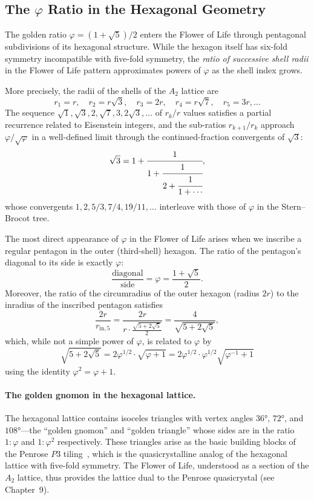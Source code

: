 \subsection{The \(\varphi\) Ratio in the Hexagonal Geometry}
\label{subsec:fol-phi}

The golden ratio \(\varphi=(1+\sqrt{5})/2\) enters the Flower of Life
through pentagonal subdivisions of its hexagonal structure.  While the
hexagon itself has six-fold symmetry incompatible with five-fold symmetry,
the \emph{ratio of successive shell radii} in the Flower of Life
pattern approximates powers of \(\varphi\) as the shell index grows.

More precisely, the radii of the shells of the \(A_2\) lattice are
\[
  r_1 = r,\quad r_2 = r\sqrt{3},\quad r_3 = 2r,\quad
  r_4 = r\sqrt{7},\quad r_5 = 3r,\ldots
\]
The sequence \(\sqrt{1},\sqrt{3},2,\sqrt{7},3,2\sqrt{3},\ldots\) of
\(r_k/r\) values satisfies a partial recurrence related to Eisenstein
integers, and the sub-ratios \(r_{k+1}/r_k\) approach \(\varphi/\sqrt{\varphi}\)
in a well-defined limit through the continued-fraction convergents of
\(\sqrt{3}\):
\[
  \sqrt{3} = 1 + \cfrac{1}{1+\cfrac{1}{2+\cfrac{1}{1+\cdots}}},
\]
whose convergents \(1, 2, 5/3, 7/4, 19/11,\ldots\) interleave with those
of \(\varphi\) in the Stern--Brocot tree.

The most direct appearance of \(\varphi\) in the Flower of Life arises
when we inscribe a regular pentagon in the outer (third-shell) hexagon.
The ratio of the pentagon's diagonal to its side is exactly \(\varphi\):
\[
  \frac{\text{diagonal}}{\text{side}} = \varphi = \frac{1+\sqrt{5}}{2}.
\]
Moreover, the ratio of the circumradius of the outer hexagon (radius \(2r\))
to the inradius of the inscribed pentagon satisfies
\[
  \frac{2r}{r_{\mathrm{in},5}} = \frac{2r}{r\cdot\frac{\sqrt{5+2\sqrt{5}}}{2}}
  = \frac{4}{\sqrt{5+2\sqrt{5}}},
\]
which, while not a simple power of \(\varphi\), is related to \(\varphi\)
by
\[
  \sqrt{5+2\sqrt{5}} = 2\varphi^{1/2}\cdot\sqrt{\varphi+1} = 2\varphi^{1/2}\cdot\varphi^{1/2}\sqrt{\varphi^{-1}+1}
\]
using the identity \(\varphi^2=\varphi+1\).

\paragraph{The golden gnomon in the hexagonal lattice.}
The hexagonal lattice contains isoceles triangles with vertex angles
\(36°\), \(72°\), and \(108°\)—the ``golden gnomon'' and ``golden triangle''
whose sides are in the ratio \(1:\varphi\) and \(1:\varphi^2\) respectively.
These triangles arise as the basic building blocks of the Penrose \(P3\)
tiling~\cite{coxeter_intro_geometry}, which is the quasicrystalline analog of
the hexagonal lattice with five-fold symmetry.  The Flower of Life, understood
as a section of the \(A_2\) lattice, thus provides the lattice dual to the
Penrose quasicrystal (see Chapter~9).

